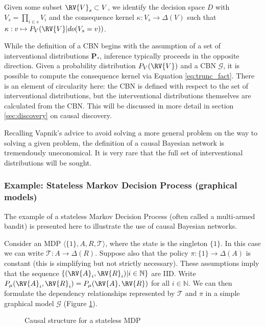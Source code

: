 Given some subset $\RV{V}_s\subset V$, we identify the decision space $D$ with $V_s=\prod_{i\in s} V_i$ and the consequence kernel $\kappa:V_s\to \Delta(V)$ such that $\kappa:v\mapsto P_V(\RV{V}|do(V_s=v))$.

While the definition of a CBN begins with the assumption of a set of interventional distributions $\mathbf{P}_*$, inference typically proceeds in the opposite direction. Given a probability distribution $P_V(\RV{V})$ and a CBN $\mathcal{G}$, it is possible to compute the consequence kernel via Equation \ref{eq:trunc_fact}. There is an element of circularity here: the CBN is defined with respect to the set of interventional distributions, but the interventional distributions themselves are calculated from the CBN. This will be discussed in more detail in section \ref{sec:discovery} on causal discovery.

Recalling Vapnik's advice to avoid solving a more general problem on the way to solving a given problem, the definition of a causal Bayesian network is tremendously uneconomical. It is very rare that the full set of interventional distributions will be sought. 

\subsubsection{Example: Stateless Markov Decision Process (graphical models)}\label{sec:smdp_graph}

The example of a stateless Markov Decision Process (often called a multi-armed bandit) is presented here to illustrate the use of causal Bayesian networks.

Consider an MDP $\langle \{1\},A,R,\mathcal{T}\rangle$, where the state is the singleton $\{1\}$. In this case we can write $\mathcal{T}:A\to \Delta(R)$. Suppose also that the policy $\pi:\{1\}\to \Delta(A)$ is constant (this is simplifying but not strictly necessary). These assumptions imply that the sequence $\{(\RV{A}_i,\RV{R}_i)|i\in \mathbb{N}\}$ are IID. Write $P_\mu(\RV{A}_i,\RV{R}_i)=P_\mu(\RV{A},\RV{R})$ for all $i\in \mathbb{N}$. We can then formulate the dependency relationships represented by $\mathcal{T}$ and $\pi$ in a simple graphical model $\mathcal{G}$ (Figure \ref{fig:stateless_mdp}).

\begin{figure}
    \centering

    \caption{Causal structure for a stateless MDP}
    \label{fig:stateless_mdp}
\end{figure}

